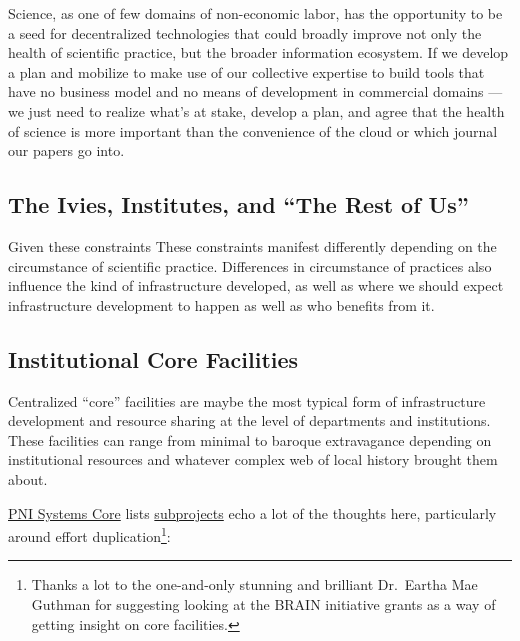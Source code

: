 \documentclass[10pt]{tufte-book}
\begin{document}
Science, as one of few domains of non-economic labor, has the
opportunity to be a seed for decentralized technologies that could
broadly improve not only the health of scientific practice, but the
broader information ecosystem. If we develop a plan and mobilize to make
use of our collective expertise to build tools that have no business
model and no means of development in commercial domains --- we just need
to realize what's at stake, develop a plan, and agree that the health of
science is more important than the convenience of the cloud or which
journal our papers go into. 




\subsection{The Ivies, Institutes, and ``The Rest of
Us''}



 Given these constraints These constraints manifest
differently depending on the circumstance of scientific practice.
Differences in circumstance of practices also influence the kind of
infrastructure developed, as well as where we should expect
infrastructure development to happen as well as who benefits from it.


\subsection{Institutional Core
Facilities}

Centralized ``core'' facilities are maybe the most typical form of
infrastructure development and resource sharing at the level of
departments and institutions. These facilities can range from minimal to
baroque extravagance depending on institutional resources and whatever
complex web of local history brought them about.

\href{https://projectreporter.nih.gov/project_info_details.cfm?aid=9444124}{PNI
Systems Core} lists
\href{https://reporter.nih.gov/project-details/9444124\#sub-Projects}{subprojects}
echo a lot of the thoughts here, particularly around effort
duplication\footnote{Thanks a lot to the one-and-only stunning and
  brilliant Dr.~Eartha Mae Guthman for suggesting looking at the BRAIN
  initiative grants as a way of getting insight on core facilities.}:
\end{document}
